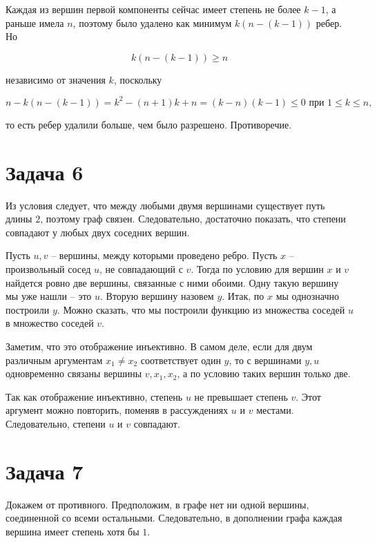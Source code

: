 	Каждая из вершин первой компоненты сейчас имеет степень не более $k - 1$, а раньше имела $n$, поэтому было удалено как минимум $k (n - (k - 1))$ ребер. Но

	\begin{equation*}
		k (n - (k - 1)) \ge n
	\end{equation*}

	независимо от значения $k$, поскольку

	\begin{equation*}
		n - k (n - (k - 1)) = k^2 - (n+1)k + n = (k - n)(k - 1) \le 0 \text{ при } 1 \le k \le n,
	\end{equation*}

	то есть ребер удалили больше, чем было разрешено. Противоречие.


	\section*{Задача 6}

	Из условия следует, что между любыми двумя вершинами существует путь длины $2$, поэтому граф связен. Следовательно, достаточно показать, что степени совпадают у любых двух соседних вершин.

	Пусть $u, v$ -- вершины, между которыми проведено ребро. Пусть $x$ -- произвольный сосед $u$, не совпадающий с $v$. Тогда по условию для вершин $x$ и $v$ найдется ровно две вершины, связанные с ними обоими. Одну такую вершину мы уже нашли -- это $u$. Вторую вершину назовем $y$. Итак, по $x$ мы однозначно построили $y$. Можно сказать, что мы построили функцию из множества соседей $u$ в множество соседей $v$.

	Заметим, что это отображение инъективно. В самом деле, если для двум различным аргументам $x_1 \ne x_2$ соответствует один $y$, то с вершинами $y, u$ одновременно связаны вершины $v, x_1, x_2$, а по условию таких вершин только две.

	Так как отображение инъективно, степень $u$ не превышает степень $v$. Этот аргумент можно повторить, поменяв в рассуждениях $u$ и $v$ местами. Следовательно, степени $u$ и $v$ совпадают.


	\section*{Задача 7}

	Докажем от противного. Предположим, в графе нет ни одной вершины, соединенной со всеми остальными. Следовательно, в дополнении графа каждая вершина имеет степень хотя бы $1$.

